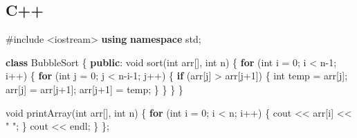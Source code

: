 \documentclass[
  letterpaper,
  DIV=11,
  numbers=noendperiod]{scrreprt}
\newenvironment{Shaded}{\begin{snugshade}}{\end{snugshade}}
\newcommand{\ControlFlowTok}[1]{\textcolor[rgb]{0.00,0.23,0.31}{\textbf{#1}}}
\newcommand{\DataTypeTok}[1]{\textcolor[rgb]{0.68,0.00,0.00}{#1}}
\newcommand{\DecValTok}[1]{\textcolor[rgb]{0.68,0.00,0.00}{#1}}
\newcommand{\ImportTok}[1]{\textcolor[rgb]{0.00,0.46,0.62}{#1}}
\newcommand{\KeywordTok}[1]{\textcolor[rgb]{0.00,0.23,0.31}{\textbf{#1}}}
\newcommand{\NormalTok}[1]{\textcolor[rgb]{0.00,0.23,0.31}{#1}}
\newcommand{\OperatorTok}[1]{\textcolor[rgb]{0.37,0.37,0.37}{#1}}
\newcommand{\PreprocessorTok}[1]{\textcolor[rgb]{0.68,0.00,0.00}{#1}}
\newcommand{\StringTok}[1]{\textcolor[rgb]{0.13,0.47,0.30}{#1}}
\begin{document}
\subsection{C++}\label{c-1}

\begin{Shaded}
\begin{Highlighting}[]
\PreprocessorTok{\#include }\ImportTok{\textless{}iostream\textgreater{}}
\KeywordTok{using} \KeywordTok{namespace}\NormalTok{ std}\OperatorTok{;}

\KeywordTok{class}\NormalTok{ BubbleSort }\OperatorTok{\{}
\KeywordTok{public}\OperatorTok{:}
    \DataTypeTok{void}\NormalTok{ sort}\OperatorTok{(}\DataTypeTok{int}\NormalTok{ arr}\OperatorTok{[],} \DataTypeTok{int}\NormalTok{ n}\OperatorTok{)} \OperatorTok{\{}
        \ControlFlowTok{for} \OperatorTok{(}\DataTypeTok{int}\NormalTok{ i }\OperatorTok{=} \DecValTok{0}\OperatorTok{;}\NormalTok{ i }\OperatorTok{\textless{}}\NormalTok{ n}\OperatorTok{{-}}\DecValTok{1}\OperatorTok{;}\NormalTok{ i}\OperatorTok{++)} \OperatorTok{\{}
            \ControlFlowTok{for} \OperatorTok{(}\DataTypeTok{int}\NormalTok{ j }\OperatorTok{=} \DecValTok{0}\OperatorTok{;}\NormalTok{ j }\OperatorTok{\textless{}}\NormalTok{ n}\OperatorTok{{-}}\NormalTok{i}\OperatorTok{{-}}\DecValTok{1}\OperatorTok{;}\NormalTok{ j}\OperatorTok{++)} \OperatorTok{\{}
                \ControlFlowTok{if} \OperatorTok{(}\NormalTok{arr}\OperatorTok{[}\NormalTok{j}\OperatorTok{]} \OperatorTok{\textgreater{}}\NormalTok{ arr}\OperatorTok{[}\NormalTok{j}\OperatorTok{+}\DecValTok{1}\OperatorTok{])} \OperatorTok{\{}
                    \DataTypeTok{int}\NormalTok{ temp }\OperatorTok{=}\NormalTok{ arr}\OperatorTok{[}\NormalTok{j}\OperatorTok{];}
\NormalTok{                    arr}\OperatorTok{[}\NormalTok{j}\OperatorTok{]} \OperatorTok{=}\NormalTok{ arr}\OperatorTok{[}\NormalTok{j}\OperatorTok{+}\DecValTok{1}\OperatorTok{];}
\NormalTok{                    arr}\OperatorTok{[}\NormalTok{j}\OperatorTok{+}\DecValTok{1}\OperatorTok{]} \OperatorTok{=}\NormalTok{ temp}\OperatorTok{;}
                \OperatorTok{\}}
            \OperatorTok{\}}
        \OperatorTok{\}}
    \OperatorTok{\}}

    \DataTypeTok{void}\NormalTok{ printArray}\OperatorTok{(}\DataTypeTok{int}\NormalTok{ arr}\OperatorTok{[],} \DataTypeTok{int}\NormalTok{ n}\OperatorTok{)} \OperatorTok{\{}
        \ControlFlowTok{for} \OperatorTok{(}\DataTypeTok{int}\NormalTok{ i }\OperatorTok{=} \DecValTok{0}\OperatorTok{;}\NormalTok{ i }\OperatorTok{\textless{}}\NormalTok{ n}\OperatorTok{;}\NormalTok{ i}\OperatorTok{++)} \OperatorTok{\{}
\NormalTok{            cout }\OperatorTok{\textless{}\textless{}}\NormalTok{ arr}\OperatorTok{[}\NormalTok{i}\OperatorTok{]} \OperatorTok{\textless{}\textless{}} \StringTok{" "}\OperatorTok{;}
        \OperatorTok{\}}
\NormalTok{        cout }\OperatorTok{\textless{}\textless{}}\NormalTok{ endl}\OperatorTok{;}
    \OperatorTok{\}}
\OperatorTok{\};}


\end{Highlighting}
\end{Shaded}
\end{document}
